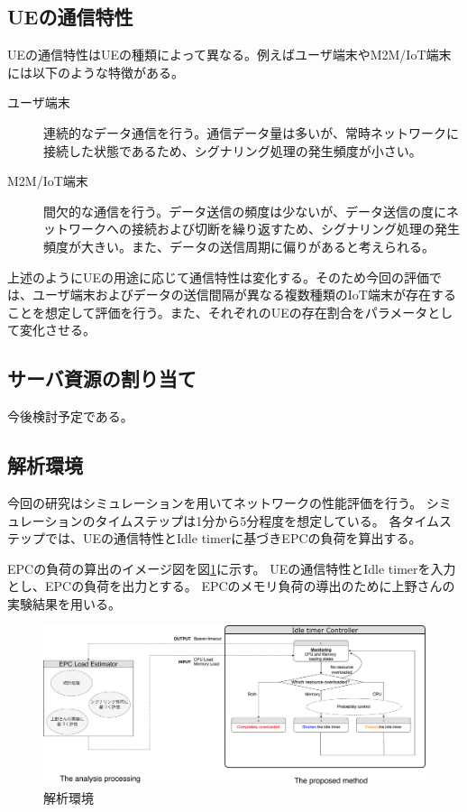 \documentclass[a4j]{ujarticle}
\begin{document}
\subsection{UEの通信特性}
UEの通信特性はUEの種類によって異なる。例えばユーザ端末やM2M/IoT端末には以下のような特徴がある。
\begin{description}
  \item[ユーザ端末] 連続的なデータ通信を行う。通信データ量は多いが、常時ネットワークに接続した状態であるため、シグナリング処理の発生頻度が小さい。
  \item[M2M/IoT端末] 間欠的な通信を行う。データ送信の頻度は少ないが、データ送信の度にネットワークへの接続および切断を繰り返すため、シグナリング処理の発生頻度が大きい。また、データの送信周期に偏りがあると考えられる。
\end{description}
上述のようにUEの用途に応じて通信特性は変化する。そのため今回の評価では、ユーザ端末およびデータの送信間隔が異なる複数種類のIoT端末が存在することを想定して評価を行う。また、それぞれのUEの存在割合をパラメータとして変化させる。


\subsection{サーバ資源の割り当て}
今後検討予定である。


\subsection{解析環境}
\label{sec:method}
今回の研究はシミュレーションを用いてネットワークの性能評価を行う。
シミュレーションのタイムステップは1分から5分程度を想定している。
各タイムステップでは、UEの通信特性とIdle timerに基づきEPCの負荷を算出する。

EPCの負荷の算出のイメージ図を図\ref{analysis_environment}に示す。
UEの通信特性とIdle timerを入力とし、EPCの負荷を出力とする。
EPCのメモリ負荷の導出のために上野さんの実験結果を用いる。
\begin{figure}[htbp]
	\centering
	\includegraphics[width=0.9\hsize]{analysis_environment.pdf}
  \caption{解析環境}
	\label{analysis_environment}
\end{figure}
\clearpage
\end{document}

